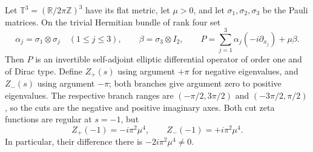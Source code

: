 \begin{theorem}\ours
Let \(\mathbb T^3=(\mathbb R/2\pi\mathbb Z)^3\) have its flat metric,
let \(\mu>0\), and let \(\sigma_1,\sigma_2,\sigma_3\) be the Pauli
matrices. On the trivial Hermitian bundle of rank four set
\[
 \alpha_j=\sigma_1\otimes\sigma_j\quad(1\le j\le3),
 \qquad \beta=\sigma_3\otimes I_2,
 \qquad
 P=\sum_{j=1}^3\alpha_j(-i\partial_{x_j})+\mu\beta.
\]
Then \(P\) is an invertible self-adjoint elliptic differential operator
of order one and of Dirac type. Define \(Z_+(s)\) using argument
\(+\pi\) for negative eigenvalues, and \(Z_-(s)\) using argument
\(-\pi\); both branches give argument zero to positive eigenvalues.
The respective branch ranges are \((-\pi/2,3\pi/2)\) and
\((-3\pi/2,\pi/2)\), so the cuts are the negative and positive
imaginary axes. Both cut zeta functions are regular at \(s=-1\), but
\[
 \boxed{Z_+(-1)=-i\pi^2\mu^4,\qquad
        Z_-(-1)=+i\pi^2\mu^4.} \tag{Z2}
\]
In particular, their difference there is \(-2i\pi^2\mu^4\ne0\).
\end{theorem}

